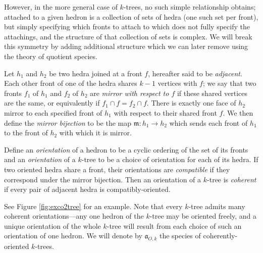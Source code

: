 \documentclass[sectionflow,singlespace,twoside,boldmathhdr]{brandiss} %
\numberwithin{section}{chapter}
\numberwithin{figure}{chapter}
\begin{document}
However, in the more general case of $k$-trees, no such simple relationship obtains; attached to a given hedron is a collection of sets of hedra (one such set per front), but simply specifying which fronts to attach to which does not fully specify the attachings, and the structure of that collection of sets is complex.
We will break this symmetry by adding additional structure which we can later remove using the theory of quotient species.

\begin{definition}
  \label{def:mirrorfronts}
  Let $h_{1}$ and $h_{2}$ be two hedra joined at a front $f$, hereafter said to be \emph{adjacent}.
  Each other front of one of the hedra shares $k-1$ vertices with $f$; we say that two fronts $f_{1}$ of $h_{1}$ and $f_{2}$ of $h_{2}$ are \emph{mirror with respect to $f$} if these shared vertices are the same, or equivalently if $f_{1} \cap f = f_{2} \cap f$.
  There is exactly one face of $h_{2}$ mirror to each specified front of $h_{1}$ with respect to their shared front $f$.
  We then define the \emph{mirror bijection} to be the map $\mathfrak{m}: h_{1} \to h_{2}$ which sends each front of $h_{1}$ to the front of $h_{2}$ with which it is mirror.
\end{definition}

\begin{comment} Don't think we need this after all...
  \begin{definition}\label{def:cycord}
    For a set $A$, define a \emph{cyclic order of $A$} to be a labeling of the cyclic digraph $\overrightarrow{C}_{\abs{A}}$ by $A$ and let $\cyc A$ be the set of such linear orders. Let $\lin A$ be the set of linear orders on $A$. Let $\psi_{A}: \lin A \to \cyc A$ (hereafter denoted simply $\psi$ when the set is unambiguous) send each linear order $\ell$ to the cyclic order obtained by decorating $\overrightarrow{C}_{\abs{A}}$ with $\ell$ in order. (Note that this map is $\abs{A}$-to-one.) Then a \emph{linearization} of a given cyclic order $c \in \cyc A$ is an element of $\psi^{-1} \pbrac{c}$.
  \end{definition}
\end{comment}

\begin{definition}
  \label{def:coktree}
  Define an \emph{orientation} of a hedron to be a cyclic ordering of the set of its fronts and an \emph{orientation} of a $k$-tree to be a choice of orientation for each of its hedra.
  If two oriented hedra share a front, their orientations are \emph{compatible} if they correspond under the mirror bijection.
  Then an orientation of a $k$-tree is \emph{coherent} if every pair of adjacent hedra is compatibly-oriented.
\end{definition}
See Figure \ref{fig:exco2tree} for an example.
Note that every $k$-tree admits many coherent orientations---any one hedron of the $k$-tree may be oriented freely, and a unique orientation of the whole $k$-tree will result from each choice of such an orientation of one hedron.
We will denote by $\mathfrak{a}_{O, k}$ the species of coherently-oriented $k$-trees.
\end{document}
